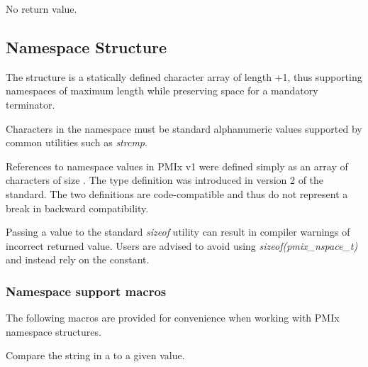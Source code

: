 
\begin{arglist}
\end{arglist}

No return value.

\subsection{Namespace Structure}

The  structure is a statically defined character array of length +1, thus supporting namespaces of maximum length  while preserving space for a mandatory  terminator.


Characters in the namespace must be standard alphanumeric values supported by common utilities such as \textit{strcmp}.

\adviceuserstart
References to namespace values in \ac{PMIx} v1 were defined simply as an array of characters of size . The  type definition was introduced in version 2 of the standard. The two definitions are code-compatible and thus do not represent a break in backward compatibility.

Passing a  value to the standard \textit{sizeof} utility can result in compiler warnings of incorrect returned value. Users are advised to avoid using \textit{sizeof(pmix_nspace_t)} and instead rely on the  constant.
\adviceuserend

\subsubsection{Namespace support macros}

The following macros are provided for convenience when working with \ac{PMIx} namespace structures.


Compare the string in a  to a given value.

